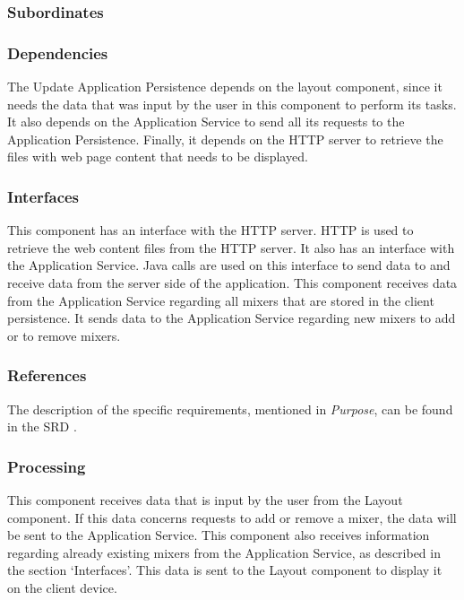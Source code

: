 \subsubsection*{Subordinates}

\subsubsection*{Dependencies}
The Update Application Persistence depends on the layout component, since it needs the data that was input by the user in this component to perform its tasks. It also depends on the Application Service to send all its requests to the Application Persistence. Finally, it depends on the HTTP server to retrieve the files with web page content that needs to be displayed.

\subsubsection*{Interfaces}
This component has an interface with the HTTP server. HTTP is used to retrieve the web content files from the HTTP server. It also has an interface with the Application Service. Java calls are used on this interface to send data to and receive data from the server side of the application. This component receives data from the Application Service regarding all mixers that are stored in the client persistence. It sends data to the Application Service regarding new mixers to add or to remove mixers.

\subsubsection*{References}
The description of the specific requirements, mentioned in \emph{Purpose}, can be found in the SRD \cite{srd}.

\subsubsection*{Processing}
This component receives data that is input by the user from the Layout component. If this data concerns requests to add or remove a mixer, the data will be sent to the Application Service. This component also receives information regarding already existing mixers from the Application Service, as described in the section `Interfaces'. This data is sent to the Layout component to display it on the client device.

